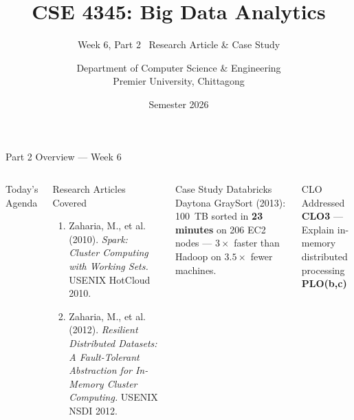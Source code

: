 \documentclass[aspectratio=169,10pt]{beamer}
\title[CSE 4345 \textbar{} Week 6, Part 2]{CSE 4345: Big Data Analytics}
\subtitle{Week 6, Part 2 \textemdash\ Research Article \& Case Study}
\author[Dept.\ of CSE]{Department of Computer Science \& Engineering\\[4pt]
       \small Premier University, Chittagong}
\institute{}
\date{Semester 2026}
\begin{document}

\begin{frame}
  \titlepage
\end{frame}

\begin{frame}{Part 2 Overview — Week 6}
  \begin{columns}[T]
      \begin{block}{Today's Agenda}
        \tableofcontents
      \end{block}

      \begin{exampleblock}{Research Articles Covered}
        \begin{enumerate}
          \item Zaharia, M., et al. (2010).
                \textit{Spark: Cluster Computing with Working Sets.}
                USENIX HotCloud 2010.
          \item Zaharia, M., et al. (2012).
                \textit{Resilient Distributed Datasets: A Fault-Tolerant
                Abstraction for In-Memory Cluster Computing.}
                USENIX NSDI 2012.
        \end{enumerate}
      \end{exampleblock}
      \vspace{6pt}
      \begin{alertblock}{Case Study}
        Databricks Daytona GraySort (2013): 100~TB sorted in
        \textbf{23 minutes} on 206 EC2 nodes — $3\times$ faster than
        Hadoop on $3.5\times$ fewer machines.
      \end{alertblock}
      \vspace{4pt}
      \begin{block}{CLO Addressed}
        \textbf{CLO3} — Explain in-memory distributed processing\\
        \textbf{PLO(b,c)}
      \end{block}
  \end{columns}
\end{frame}

\end{document}
